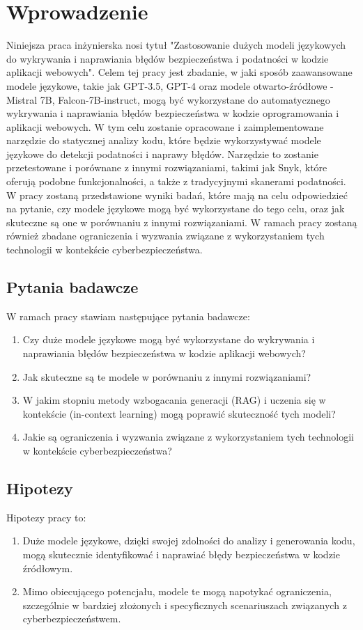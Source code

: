 
\chapter*{Wprowadzenie}

Niniejsza praca inżynierska nosi tytuł "Zastosowanie dużych modeli językowych do wykrywania i naprawiania błędów bezpieczeństwa i podatności w kodzie aplikacji webowych". Celem tej pracy jest zbadanie, w jaki sposób zaawansowane modele językowe, takie jak GPT-3.5, GPT-4 oraz modele otwarto-źródłowe - Mistral 7B, Falcon-7B-instruct, mogą być wykorzystane do automatycznego wykrywania i naprawiania błędów bezpieczeństwa w kodzie oprogramowania i aplikacji webowych. 
W tym celu zostanie opracowane i zaimplementowane narzędzie do statycznej analizy kodu, które będzie wykorzystywać modele językowe do detekcji podatności i naprawy błędów.
Narzędzie to zostanie przetestowane i porównane z innymi rozwiązaniami, takimi jak Snyk, które oferują podobne funkcjonalności, a także z tradycyjnymi skanerami podatności.
W pracy zostaną przedstawione wyniki badań, które mają na celu odpowiedzieć na pytanie, czy modele językowe mogą być wykorzystane do tego celu, oraz jak skuteczne są one w porównaniu z innymi rozwiązaniami.
W ramach pracy zostaną również zbadane ograniczenia i wyzwania związane z wykorzystaniem tych technologii w kontekście cyberbezpieczeństwa.

\section*{Pytania badawcze}
W ramach pracy stawiam następujące pytania badawcze:
\begin{enumerate}
    \item Czy duże modele językowe mogą być wykorzystane do wykrywania i naprawiania błędów bezpieczeństwa w kodzie aplikacji webowych?
    \item Jak skuteczne są te modele w porównaniu z innymi rozwiązaniami?
    \item W jakim stopniu metody wzbogacania generacji (RAG) i uczenia się w kontekście (in-context learning) mogą poprawić skuteczność tych modeli?
    \item Jakie są ograniczenia i wyzwania związane z wykorzystaniem tych technologii w kontekście cyberbezpieczeństwa?
\end{enumerate}

\section*{Hipotezy}
Hipotezy pracy to:
\begin{enumerate}
    \item Duże modele językowe, dzięki swojej zdolności do analizy i generowania kodu, mogą skutecznie identyfikować i naprawiać błędy bezpieczeństwa w kodzie źródłowym.
    \item Mimo obiecującego potencjału, modele te mogą napotykać ograniczenia, szczególnie w bardziej złożonych i specyficznych scenariuszach związanych z cyberbezpieczeństwem.
\end{enumerate}

